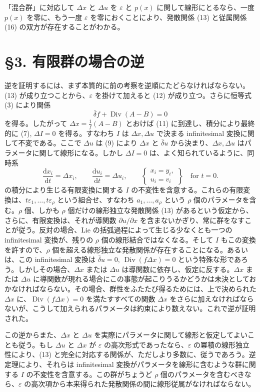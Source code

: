 \documentclass[11pt]{article}
\newcommand{\D}{\Delta}
\newcommand{\eps}{\varepsilon}
\providecommand{\dd}{\mathrm d}
\providecommand{\Div}{\operatorname{Div}}
\providecommand{\bd}{\bar{\delta}}
\providecommand{\p}{\partial}
\begin{document}
「混合群」に対応して \(\D x\) と \(\D u\) を \(\eps\) と \(p(x)\) に関して線形にとるなら、一度 \(p(x)\) を零に、もう一度 \(\eps\) を零におくことにより、発散関係 (13) と従属関係 (16) の双方が存在することがわかる。

\section*{\S{}3. 有限群の場合の逆}

逆を証明するには、まず本質的に前の考察を逆順にたどらなければならない。(13) が成り立つことから、\(\eps\) を掛けて加えると (12) が成り立つ。さらに恒等式 (3) により関係
\[
\bd f+\Div(A-B)=0
\]
を得る。したがって \(\D x=\frac1f(A-B)\) とおけば (11) に到達し、積分により最終的に (7), \(\D I=0\) を得る。すなわち \(I\) は \(\D x,\D u\) で決まる infinitesimal 変換に関して不変である。ここで \(\D u\) は (9) により \(\D x\) と \(\bd u\) から決まり、\(\D x,\D u\) はパラメータに関して線形になる。しかし \(\D I=0\) は、よく知られているように、同時系
\begin{equation}
\frac{\dd x_i}{\dd t}=\D x_i,\qquad
\frac{\dd u_i}{\dd t}=\D u_i,\qquad
\left\{\begin{array}{l}
x_i=y_i,\\
u_i=v_i
\end{array}\right\}
\quad\text{for }t=0.
\tag{17}
\end{equation}
の積分により生じる有限変換に関する \(I\) の不変性を含意する。これらの有限変換は、\(t\eps_1,\ldots,t\eps_\rho\) という組合せ、すなわち \(a_1,\ldots,a_\rho\) という \(\rho\) 個のパラメータを含む。\(\rho\) 個、しかも \(\rho\) 個だけの線形独立な発散関係 (13) があるという仮定から、さらに、有限変換は、それが導関数 \(\p u/\p x\) を含まないかぎり、常に群をなすことが従う。反対の場合、Lie の括弧過程によって生じる少なくとも一つの infinitesimal 変換が、残りの \(\rho\) 個の線形結合ではなくなる。そして \(I\) もこの変換を許すので、\(\rho\) 個を超える線形独立な発散関係が存在することになる。あるいは、この infinitesimal 変換は \(\bd u=0,\ \Div(f\D x)=0\) という特殊な形であろう。しかしその場合、\(\D x\) または \(\D u\) は導関数に依存し、仮定に反する。\(\D x\) または \(\D u\) に導関数が現れる場合にこの事態が起こりうるかどうかは未決としておかなければならない。その場合、群性をふたたび得るためには、上で決められた \(\D x\) に、\(\Div(f\D x)=0\) を満たすすべての関数 \(\D x\) をさらに加えなければならないが、こうして加えられるパラメータは約束により数えない。これで逆が証明された。

この逆からまた、\(\D x\) と \(\D u\) を実際にパラメータに関して線形と仮定してよいことも従う。もし \(\D u\) と \(\D x\) が \(\eps\) の高次形式であったなら、\(\eps\) の冪積の線形独立性により、(13) と完全に対応する関係が、ただしより多数に、従うであろう。逆定理により、それらは infinitesimal 変換がパラメータを線形に含むような群に関する \(I\) の不変性を含意する。この群がちょうど \(\rho\) 個のパラメータを含むべきなら、\(\eps\) の高次項から本来得られた発散関係の間に線形従属がなければならない。
\end{document}
